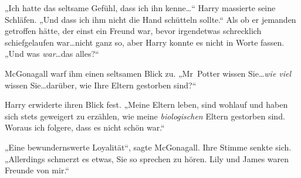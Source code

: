 „Ich hatte das seltsame Gefühl, dass ich ihn kenne…“ Harry massierte seine Schläfen.
„Und dass ich ihm nicht die Hand schütteln sollte.“ Als ob er jemanden getroffen hätte, der einst ein Freund war, bevor irgendetwas schrecklich schiefgelaufen war…nicht ganz so, aber Harry konnte es nicht in Worte fassen.
„Und was \emph{war}…das alles?“

McGonagall warf ihm einen seltsamen Blick zu.
„Mr~Potter wissen Sie…\emph{wie viel} wissen Sie…darüber, wie Ihre Eltern gestorben sind?“

Harry erwiderte ihren Blick fest.
„Meine Eltern leben, sind wohlauf und haben sich stets geweigert zu erzählen, wie meine \emph{biologischen} Eltern gestorben sind. Woraus ich folgere, dass es nicht schön war.“

„Eine bewundernswerte Loyalität“, sagte McGonagall. Ihre Stimme senkte sich.
„Allerdings schmerzt es etwas, Sie so sprechen zu hören. Lily und James waren Freunde von mir.“


